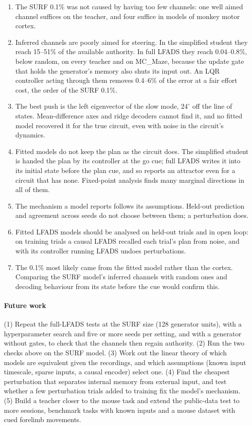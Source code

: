 \documentclass[11pt,a4paper]{article}
\begin{document}
\begin{enumerate}
  \item The SURF 0.1\% was not caused by having too few channels: one well aimed channel suffices on the teacher, and four suffice in models of monkey motor cortex.
  \item Inferred channels are poorly aimed for steering. In the simplified student they reach 15--51\% of the available authority. In full LFADS they reach 0.04--0.8\%, below random, on every teacher and on MC\_Maze, because the update gate that holds the generator's memory also shuts its input out. An LQR controller acting through them removes 0.4--6\% of the error at a fair effort cost, the order of the SURF 0.1\%.
  \item The best push is the left eigenvector of the slow mode, $24^\circ$ off the line of states. Mean-difference axes and ridge decoders cannot find it, and no fitted model recovered it for the true circuit, even with noise in the circuit's dynamics.
  \item Fitted models do not keep the plan as the circuit does. The simplified student is handed the plan by its controller at the go cue; full LFADS writes it into its initial state before the plan cue, and so reports an attractor even for a circuit that has none. Fixed-point analysis finds many marginal directions in all of them.
  \item The mechanism a model reports follows its assumptions. Held-out prediction and agreement across seeds do not choose between them; a perturbation does.
  \item Fitted LFADS models should be analysed on held-out trials and in open loop: on training trials a causal LFADS recalled each trial's plan from noise, and with its controller running LFADS undoes perturbations.
  \item The 0.1\% most likely came from the fitted model rather than the cortex. Comparing the SURF model's inferred channels with random ones and decoding behaviour from its state before the cue would confirm this.
\end{enumerate}

\paragraph{Future work}
(1) Repeat the full-LFADS tests at the SURF size (128 generator units), with a hyperparameter search and five or more seeds per setting, and with a generator without gates, to check that the channels then regain authority. (2) Run the two checks above on the SURF model. (3) Work out the linear theory of which models are equivalent given the recordings, and which assumptions (known input timescale, sparse inputs, a causal encoder) select one. (4) Find the cheapest perturbation that separates internal memory from external input, and test whether a few perturbation trials added to training fix the model's mechanism. (5) Build a teacher closer to the mouse task and extend the public-data test to more sessions, benchmark tasks with known inputs \citep{versteeg2025} and a mouse dataset with cued forelimb movements.
\end{document}
